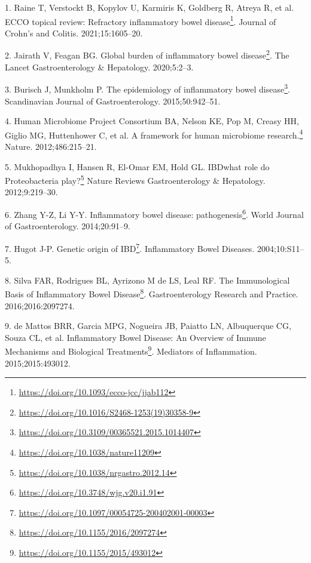 \documentclass[
  a4paper,
]{book}
\DeclareRobustCommand{\href}[2]{#2\footnote{\url{#1}}}
\newlength{\cslhangindent}
\newlength{\cslentryspacingunit} %
\newenvironment{CSLReferences}[2] %
 {%
  \setlength{\parindent}{0pt}
  \ifodd #1
  \let\oldpar\par
  \def\par{\hangindent=\cslhangindent\oldpar}
  \fi
  \setlength{\parskip}{#2\cslentryspacingunit}
 }%
 {}
\begin{document}
\hypertarget{refs}{}
\begin{CSLReferences}{0}{0}
\leavevmode{}%
1. Raine T, Verstockt B, Kopylov U, Karmiris K, Goldberg R, Atreya R, et al. \href{https://doi.org/10.1093/ecco-jcc/jjab112}{ECCO topical review: Refractory inflammatory bowel disease}. Journal of Crohn's and Colitis. 2021;15:1605--20.

\leavevmode{}%
2. Jairath V, Feagan BG. \href{https://doi.org/10.1016/S2468-1253(19)30358-9}{Global burden of inflammatory bowel disease}. The Lancet Gastroenterology \& Hepatology. 2020;5:2--3.

\leavevmode{}%
3. Burisch J, Munkholm P. \href{https://doi.org/10.3109/00365521.2015.1014407}{The epidemiology of inflammatory bowel disease}. Scandinavian Journal of Gastroenterology. 2015;50:942--51.

\leavevmode{}%
4. Human Microbiome Project Consortium BA, Nelson KE, Pop M, Creasy HH, Giglio MG, Huttenhower C, et al. \href{https://doi.org/10.1038/nature11209}{A framework for human microbiome research.} Nature. 2012;486:215--21.

\leavevmode{}%
5. Mukhopadhya I, Hansen R, El-Omar EM, Hold GL. \href{https://doi.org/10.1038/nrgastro.2012.14}{IBD{\textemdash}what role do Proteobacteria play?} Nature Reviews Gastroenterology \& Hepatology. 2012;9:219--30.

\leavevmode{}%
6. Zhang Y-Z, Li Y-Y. \href{https://doi.org/10.3748/wjg.v20.i1.91}{Inflammatory bowel disease: pathogenesis}. World Journal of Gastroenterology. 2014;20:91--9.

\leavevmode{}%
7. Hugot J-P. \href{https://doi.org/10.1097/00054725-200402001-00003}{Genetic origin of IBD}. Inflammatory Bowel Diseases. 2004;10:S11--5.

\leavevmode{}%
8. Silva FAR, Rodrigues BL, Ayrizono M de LS, Leal RF. \href{https://doi.org/10.1155/2016/2097274}{The Immunological Basis of Inflammatory Bowel Disease}. Gastroenterology Research and Practice. 2016;2016:2097274.

\leavevmode{}%
9. de Mattos BRR, Garcia MPG, Nogueira JB, Paiatto LN, Albuquerque CG, Souza CL, et al. \href{https://doi.org/10.1155/2015/493012}{Inflammatory Bowel Disease: An Overview of Immune Mechanisms and Biological Treatments}. Mediators of Inflammation. 2015;2015:493012.


\end{CSLReferences}
\end{document}
